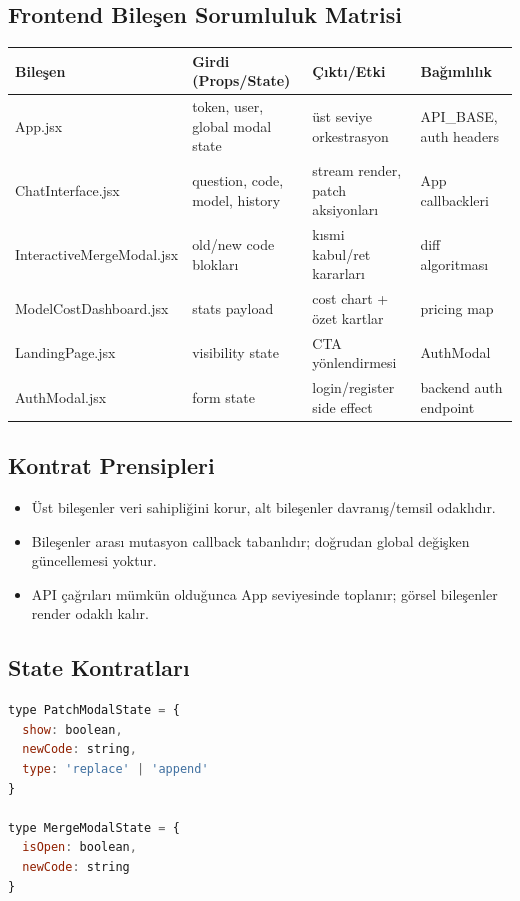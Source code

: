 \documentclass[12pt,a4paper]{article}
\begin{document}
\subsection{Frontend Bileşen Sorumluluk Matrisi}
\begin{longtable}{@{} P{3.0cm} P{3.2cm} P{3.8cm} P{2.7cm} @{}}
\toprule
Bileşen & Girdi (Props/State) & Çıktı/Etki & Bağımlılık \\
\midrule
App.jsx & token, user, global modal state & üst seviye orkestrasyon & API\_BASE, auth headers \\
ChatInterface.jsx & question, code, model, history & stream render, patch aksiyonları & App callbackleri \\
InteractiveMergeModal.jsx & old/new code blokları & kısmi kabul/ret kararları & diff algoritması \\
ModelCostDashboard.jsx & stats payload & cost chart + özet kartlar & pricing map \\
LandingPage.jsx & visibility state & CTA yönlendirmesi & AuthModal \\
AuthModal.jsx & form state & login/register side effect & backend auth endpoint \\
\bottomrule
\end{longtable}

\subsection{Kontrat Prensipleri}
\begin{itemize}[leftmargin=*]
  \item Üst bileşenler veri sahipliğini korur, alt bileşenler davranış/temsil odaklıdır.
  \item Bileşenler arası mutasyon callback tabanlıdır; doğrudan global değişken güncellemesi yoktur.
  \item API çağrıları mümkün olduğunca App seviyesinde toplanır; görsel bileşenler render odaklı kalır.
\end{itemize}

\subsection{State Kontratları}
\begin{lstlisting}[language=JavaScript, caption=Patch state kontrati]
type PatchModalState = {
  show: boolean,
  newCode: string,
  type: 'replace' | 'append'
}

type MergeModalState = {
  isOpen: boolean,
  newCode: string
}
\end{lstlisting}
\end{document}
